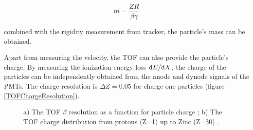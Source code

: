 \begin{equation}
m=\frac{ZR}{\beta \gamma}
\label{MassEquation}
\end{equation}

combined with the rigidity measurement from tracker, the particle's mass can be obtained. \par  

Apart from measuring the velocity, the TOF can also provide the particle's charge. By measuring the ionization energy loss ${\rm{d}}E/{\rm{d}}X$, the charge of the particles can be independently obtained from the anode and dynode signals of the PMTs. The charge resolution is $\Delta Z=0.05$ for charge one particles (figure \ref{TOFChargeResolution}).  \par

\begin{figure}[H] 
\centering   
{}    
\caption[The TOF $\beta$ resolution and charge distribution.]{a) The TOF $\beta$ resolution as a function for particle charge \cite{TOFdetector}; b) The TOF charge distribution from protons (Z=1) up to Zinc (Z=30) \cite{TOFdetector}. }
\label{TOFReesolutions}    
\end{figure}

